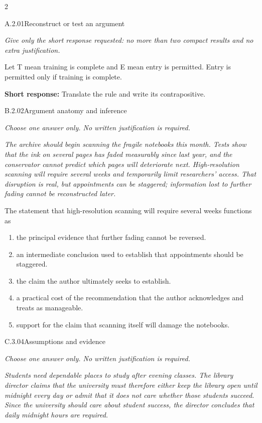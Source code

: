 \documentclass[9pt]{extarticle}
\newcommand{\choice}[1]{\item #1}
\begin{document}
\begin{multicols}{2}
\begin{DenseCoreProblem}{A.2.01}{Reconstruct or test an argument}
{\scriptsize\textit{Give only the short response requested: no more than two compact results and no extra justification.}\par}
Let T mean training is complete and E mean entry is permitted. Entry is permitted only if training is complete.

\textbf{Short response:} Translate the rule and write its contrapositive.
\end{DenseCoreProblem}
\begin{DenseCoreProblem}{B.2.02}{Argument anatomy and inference}
{\scriptsize\textit{Choose one answer only. No written justification is required.}\par}
\emph{The archive should begin scanning the fragile notebooks this month. Tests show that the ink on several pages has faded measurably since last year, and the conservator cannot predict which pages will deteriorate next. High-resolution scanning will require several weeks and temporarily limit researchers' access. That disruption is real, but appointments can be staggered; information lost to further fading cannot be reconstructed later.}

The statement that high-resolution scanning will require several weeks functions as
\begin{enumerate}[label=(\alph*)]
  \choice{the principal evidence that further fading cannot be reversed.}
  \choice{an intermediate conclusion used to establish that appointments should be staggered.}
  \choice{the claim the author ultimately seeks to establish.}
  \choice{a practical cost of the recommendation that the author acknowledges and treats as manageable.}
  \choice{support for the claim that scanning itself will damage the notebooks.}
\end{enumerate}
\end{DenseCoreProblem}
\columnbreak
\begin{DenseCoreProblem}{C.3.04}{Assumptions and evidence}
{\scriptsize\textit{Choose one answer only. No written justification is required.}\par}
\emph{Students need dependable places to study after evening classes. The library director claims that the university must therefore either keep the library open until midnight every day or admit that it does not care whether those students succeed. Since the university should care about student success, the director concludes that daily midnight hours are required.}


\end{DenseCoreProblem}
\end{multicols}
\end{document}
